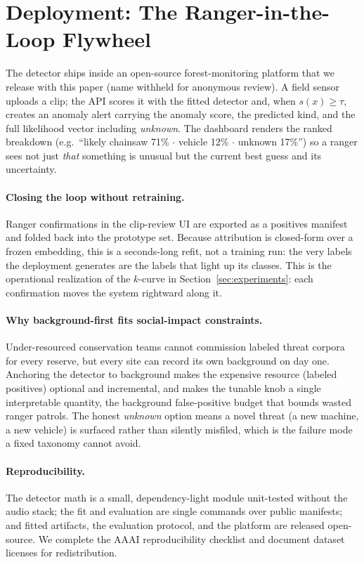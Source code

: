 \section{Deployment: The Ranger-in-the-Loop Flywheel}
\label{sec:deployment}

The detector ships inside an open-source forest-monitoring platform that we
release with this paper (name withheld for anonymous review).
A field sensor uploads a clip; the API scores it with the fitted detector and,
when $s(x)\ge\tau$, creates an anomaly alert carrying the anomaly score, the
predicted kind, and the full likelihood vector including \emph{unknown}. The
dashboard renders the ranked breakdown (e.g.\ ``likely chainsaw 71\% $\cdot$
vehicle 12\% $\cdot$ unknown 17\%'') so a ranger sees not just \emph{that}
something is unusual but the current best guess and its uncertainty.

\paragraph{Closing the loop without retraining.} Ranger confirmations in the
clip-review UI are exported as a positives manifest and folded back into the
prototype set. Because attribution is closed-form over a frozen embedding, this
is a seconds-long refit, not a training run: the very labels the deployment
generates are the labels that light up its classes. This is the operational
realization of the $k$-curve in Section~\ref{sec:experiments}: each
confirmation moves the system rightward along it.

\paragraph{Why background-first fits social-impact constraints.} Under-resourced
conservation teams cannot commission labeled threat corpora for every reserve,
but every site can record its own background on day one. Anchoring the detector
to background makes the expensive resource (labeled positives) optional and
incremental, and makes the tunable knob a single interpretable
quantity, the background false-positive budget that bounds wasted ranger
patrols. The honest \emph{unknown} option means a novel threat (a new machine, a
new vehicle) is surfaced rather than silently misfiled, which is the failure
mode a fixed taxonomy cannot avoid.

\paragraph{Reproducibility.} The detector math is a small, dependency-light
module unit-tested without the audio stack; the fit and evaluation are single
commands over public manifests; and fitted artifacts, the evaluation protocol,
and the platform are released open-source. We complete the AAAI reproducibility
checklist and document dataset licenses for redistribution.
